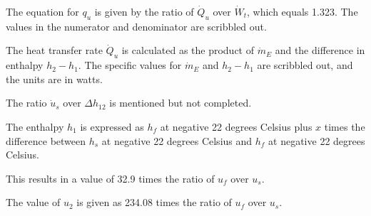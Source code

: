 The equation for \( q_u \) is given by the ratio of \( \dot{Q}_u \) over \( \dot{W}_t \), which equals 1.323. The values in the numerator and denominator are scribbled out.

The heat transfer rate \( \dot{Q}_u \) is calculated as the product of \( \dot{m}_E \) and the difference in enthalpy \( h_2 - h_1 \). The specific values for \( \dot{m}_E \) and \( h_2 - h_1 \) are scribbled out, and the units are in watts.

The ratio \( \dot{u}_s \) over \( \Delta h_{12} \) is mentioned but not completed.

The enthalpy \( h_1 \) is expressed as \( h_f \) at negative 22 degrees Celsius plus \( x \) times the difference between \( h_s \) at negative 22 degrees Celsius and \( h_f \) at negative 22 degrees Celsius.

This results in a value of 32.9 times the ratio of \( u_f \) over \( u_s \).

The value of \( u_2 \) is given as 234.08 times the ratio of \( u_f \) over \( u_s \).